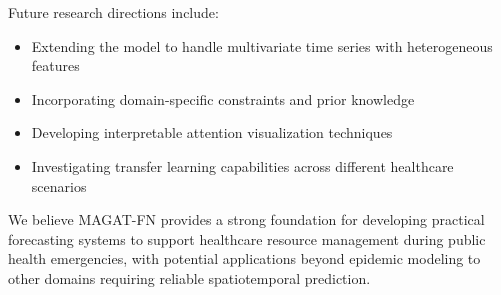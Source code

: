 \documentclass[lettersize, journal]{IEEEtran}
\begin{document}
Future research directions include:
\begin{itemize}
    \item Extending the model to handle multivariate time series with heterogeneous features
    \item Incorporating domain-specific constraints and prior knowledge
    \item Developing interpretable attention visualization techniques
    \item Investigating transfer learning capabilities across different healthcare scenarios
\end{itemize}

We believe MAGAT-FN provides a strong foundation for developing practical forecasting systems to support healthcare resource management during public health emergencies, with potential applications beyond epidemic modeling to other domains requiring reliable spatiotemporal prediction.



\end{document}
